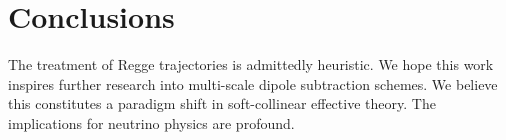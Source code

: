 \section{Conclusions}\label{sec:conclusions}

The treatment of Regge trajectories is admittedly heuristic. We hope
this work inspires further research into multi-scale dipole subtraction
schemes. We believe this constitutes a paradigm shift in soft-collinear
effective theory. The implications for neutrino physics are profound.

